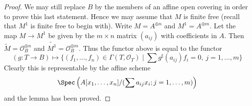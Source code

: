 \begin{proof}
\medskip\noindent
We may still replace $B$ by the members of an affine open covering
in order to prove this last statement. Hence we may assume that $M$
is finite free (recall that $M^1$ is finite free to begin with).
Write $M = A^{\oplus n}$ and $M^1 = A^{\oplus m}$. Let the map
$M \to M^1$ be given by the $m \times n$ matrix $(a_{ij})$ with
coefficients in $A$. Then $\widetilde{M} = \mathcal{O}_B^{\oplus n}$
and $\widetilde{M^1} = \mathcal{O}_B^{\oplus m}$. Thus the functor
above is equal to the functor
$$
(g : T \to B) \longmapsto
\{(f_1, \ldots, f_n) \in \Gamma(T, \mathcal{O}_T) \mid
\sum g^\sharp(a_{ij})f_i = 0,\ j = 1, \ldots, m\}
$$
Clearly this is representable by the affine scheme
$$
\Spec\left(A[x_1, \ldots, x_n]/(\sum a_{ij}x_i; j = 1, \ldots, m)\right)
$$
and the lemma has been proved.
\end{proof}
